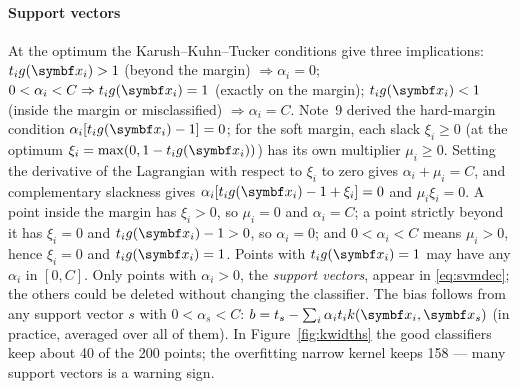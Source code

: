 \documentclass[11pt]{article}
\begin{document}
\paragraph{Support vectors} At the optimum the Karush--Kuhn--Tucker conditions give three implications: $t_ig(\x_i) > 1$
(beyond the margin) $\Rightarrow \alpha_i = 0$; $0 < \alpha_i < C \Rightarrow t_ig(\x_i) = 1$ (exactly on the margin);
$t_ig(\x_i) < 1$ (inside the margin or misclassified) $\Rightarrow \alpha_i = C$. Note~9 derived the hard-margin
condition $\alpha_i[t_ig(\x_i) - 1] = 0$; for the soft margin, each slack $\xi_i \ge 0$ (at the optimum $\xi_i =
\max(0, 1 - t_ig(\x_i))$) has its own multiplier $\mu_i \ge 0$. Setting the derivative of the Lagrangian with respect to
$\xi_i$ to zero gives $\alpha_i + \mu_i = C$, and complementary slackness gives $\alpha_i[t_ig(\x_i) - 1 + \xi_i] = 0$
and $\mu_i\xi_i = 0$. A point inside the margin has $\xi_i > 0$, so $\mu_i = 0$ and $\alpha_i = C$; a point strictly
beyond it has $\xi_i = 0$ and $t_ig(\x_i) - 1 > 0$, so $\alpha_i = 0$; and $0 < \alpha_i < C$ means $\mu_i > 0$, hence
$\xi_i = 0$ and $t_ig(\x_i) = 1$. Points with $t_ig(\x_i) = 1$ may have any
$\alpha_i$ in $[0, C]$. Only points with $\alpha_i > 0$, the \emph{support vectors}, appear in \eqref{eq:svmdec}; the
others could be deleted without changing the classifier. The bias follows from any support vector $s$ with
$0 < \alpha_s < C$: $b = t_s - \sum_i \alpha_i t_i k(\x_i, \x_s)$ (in practice, averaged over all of them). In
Figure~\ref{fig:kwidths} the good classifiers keep about 40 of the 200 points; the overfitting narrow kernel keeps 158 --- many support vectors is a warning sign.
\end{document}
